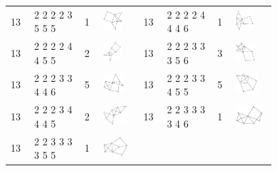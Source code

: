 \begin{footnotesize}
\begin{longtable}{
        m{0.05\linewidth} m{0.15\linewidth} m{0.05\linewidth} m{0.12\linewidth} |
        m{0.05\linewidth} m{0.15\linewidth} m{0.05\linewidth} m{0.12\linewidth}
    }
13 & 2 2 2 2 3 5 5 5 & 1 & \includegraphics[height=0.7151cm]{15-universal-graphs/img/degree-sequences-example-graphs/graph-4-8-52} &
13 & 2 2 2 2 4 4 4 6 & 1 & \includegraphics[height=0.7151cm]{15-universal-graphs/img/degree-sequences-example-graphs/graph-4-8-53}\\
13 & 2 2 2 2 4 4 5 5 & 2 & \includegraphics[height=0.7151cm]{15-universal-graphs/img/degree-sequences-example-graphs/graph-4-8-54} &
13 & 2 2 2 3 3 3 5 6 & 3 & \includegraphics[height=0.7151cm]{15-universal-graphs/img/degree-sequences-example-graphs/graph-4-8-55}\\
13 & 2 2 2 3 3 4 4 6 & 5 & \includegraphics[height=0.7151cm]{15-universal-graphs/img/degree-sequences-example-graphs/graph-4-8-56} &
13 & 2 2 2 3 3 4 5 5 & 5 & \includegraphics[height=0.7151cm]{15-universal-graphs/img/degree-sequences-example-graphs/graph-4-8-57}\\
13 & 2 2 2 3 4 4 4 5 & 2 & \includegraphics[height=0.7151cm]{15-universal-graphs/img/degree-sequences-example-graphs/graph-4-8-58} &
13 & 2 2 3 3 3 3 4 6 & 1 & \includegraphics[height=0.7151cm]{15-universal-graphs/img/degree-sequences-example-graphs/graph-4-8-59}\\
13 & 2 2 3 3 3 3 5 5 & 1 & \includegraphics[height=0.7151cm]{15-universal-graphs/img/degree-sequences-example-graphs/graph-4-8-60} &

\end{longtable}
\end{footnotesize}
